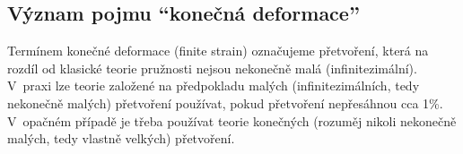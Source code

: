
\subsection{Význam pojmu \enquote{konečná deformace}}
Termínem konečné deformace (finite strain) označujeme přetvoření, která na rozdíl od klasické teorie pružnosti nejsou nekonečně malá (infinitezimální).
V~praxi lze teorie založené na předpokladu malých (infinitezimálních, tedy nekonečně malých) přetvoření používat, pokud přetvoření nepřesáhnou cca 1\%.
V~opačném případě je třeba používat teorie konečných (rozuměj nikoli nekonečně malých, tedy vlastně velkých) přetvoření.
